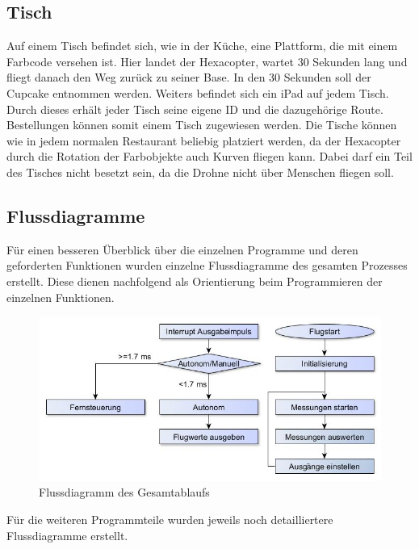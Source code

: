   \subsection*{Tisch}
  Auf einem Tisch befindet sich, wie in der Küche, eine Plattform, die mit einem Farbcode versehen ist. Hier landet der Hexacopter, wartet 30 Sekunden lang und fliegt danach den Weg zurück zu seiner Base. In den 30 Sekunden soll der Cupcake entnommen werden. Weiters befindet sich ein iPad auf jedem Tisch. Durch dieses erhält jeder Tisch seine eigene ID und die dazugehörige Route. Bestellungen können somit einem Tisch zugewiesen werden.
  Die Tische können wie in jedem normalen Restaurant beliebig platziert werden, da der Hexacopter durch die Rotation der Farbobjekte auch Kurven fliegen kann. Dabei darf ein Teil des Tisches nicht besetzt sein, da die Drohne nicht über Menschen fliegen soll.


  \subsection{Flussdiagramme}
  Für einen besseren Überblick über die einzelnen Programme und deren geforderten Funktionen wurden einzelne Flussdiagramme des gesamten Prozesses erstellt.
  Diese dienen nachfolgend als Orientierung beim Programmieren der einzelnen Funktionen.

  \begin{figure}[tbh]
    \begin{centering}
      \includegraphics[width = \textwidth]{Bilder/Flussdiagramm}
    \par\end{centering}
    \caption{Flussdiagramm des Gesamtablaufs}
    \label{Flussdiragramm}
  \end{figure}

  Für die weiteren Programmteile wurden jeweils noch detailliertere Flussdiagramme erstellt.

